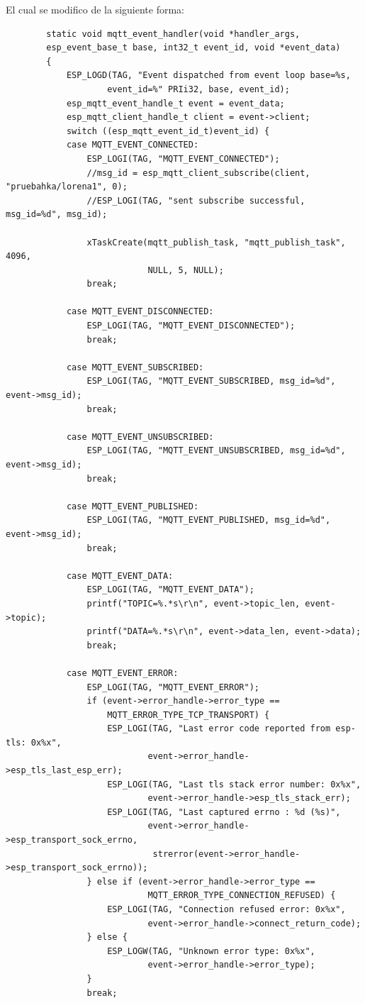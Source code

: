 \documentclass[12pt, a4paper]{article}
\begin{document}
    El cual se modifico de la siguiente forma:

    \begin{verbatim}
        static void mqtt_event_handler(void *handler_args, 
        esp_event_base_t base, int32_t event_id, void *event_data)
        {
            ESP_LOGD(TAG, "Event dispatched from event loop base=%s, 
                    event_id=%" PRIi32, base, event_id);
            esp_mqtt_event_handle_t event = event_data;
            esp_mqtt_client_handle_t client = event->client;
            switch ((esp_mqtt_event_id_t)event_id) {
            case MQTT_EVENT_CONNECTED:
                ESP_LOGI(TAG, "MQTT_EVENT_CONNECTED");
                //msg_id = esp_mqtt_client_subscribe(client, "pruebahka/lorena1", 0);
                //ESP_LOGI(TAG, "sent subscribe successful, msg_id=%d", msg_id);
        
                xTaskCreate(mqtt_publish_task, "mqtt_publish_task", 4096, 
                            NULL, 5, NULL);
                break;
        
            case MQTT_EVENT_DISCONNECTED:
                ESP_LOGI(TAG, "MQTT_EVENT_DISCONNECTED");
                break;
        
            case MQTT_EVENT_SUBSCRIBED:
                ESP_LOGI(TAG, "MQTT_EVENT_SUBSCRIBED, msg_id=%d", event->msg_id);
                break;
        
            case MQTT_EVENT_UNSUBSCRIBED:
                ESP_LOGI(TAG, "MQTT_EVENT_UNSUBSCRIBED, msg_id=%d", event->msg_id);
                break;
        
            case MQTT_EVENT_PUBLISHED:
                ESP_LOGI(TAG, "MQTT_EVENT_PUBLISHED, msg_id=%d", event->msg_id);
                break;
        
            case MQTT_EVENT_DATA:
                ESP_LOGI(TAG, "MQTT_EVENT_DATA");
                printf("TOPIC=%.*s\r\n", event->topic_len, event->topic);
                printf("DATA=%.*s\r\n", event->data_len, event->data);
                break;
        
            case MQTT_EVENT_ERROR:
                ESP_LOGI(TAG, "MQTT_EVENT_ERROR");
                if (event->error_handle->error_type == 
                    MQTT_ERROR_TYPE_TCP_TRANSPORT) {
                    ESP_LOGI(TAG, "Last error code reported from esp-tls: 0x%x", 
                            event->error_handle->esp_tls_last_esp_err);
                    ESP_LOGI(TAG, "Last tls stack error number: 0x%x", 
                            event->error_handle->esp_tls_stack_err);
                    ESP_LOGI(TAG, "Last captured errno : %d (%s)",  
                            event->error_handle->esp_transport_sock_errno,
                             strerror(event->error_handle->esp_transport_sock_errno));
                } else if (event->error_handle->error_type == 
                            MQTT_ERROR_TYPE_CONNECTION_REFUSED) {
                    ESP_LOGI(TAG, "Connection refused error: 0x%x", 
                            event->error_handle->connect_return_code);
                } else {
                    ESP_LOGW(TAG, "Unknown error type: 0x%x", 
                            event->error_handle->error_type);
                }
                break;
        

\end{verbatim}
\end{document}
